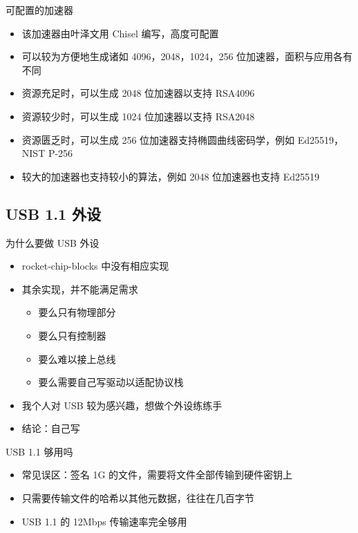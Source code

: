 \documentclass[aspectratio=169]{ctexbeamer}
\begin{document}
\begin{frame}{可配置的加速器}
  \begin{itemize}
    \item 该加速器由叶泽文用 Chisel 编写，高度可配置
    \item 可以较为方便地生成诸如 4096，2048，1024，256 位加速器，面积与应用各有不同
    \item 资源充足时，可以生成 2048 位加速器以支持 RSA4096
    \item 资源较少时，可以生成 1024 位加速器以支持 RSA2048
    \item 资源匮乏时，可以生成 256 位加速器支持椭圆曲线密码学，例如 Ed25519，NIST P-256
    \item 较大的加速器也支持较小的算法，例如 2048 位加速器也支持 Ed25519
  \end{itemize}
\end{frame}

\subsection{USB 1.1 外设} %
\begin{frame}{为什么要做 USB 外设}
  \begin{itemize}
    \item rocket-chip-blocks 中没有相应实现
    \item 其余实现，并不能满足需求\begin{itemize}
      \item 要么只有物理部分
      \item 要么只有控制器
      \item 要么难以接上总线
      \item 要么需要自己写驱动以适配协议栈
    \end{itemize}
    \item 我个人对 USB 较为感兴趣，想做个外设练练手
    \item 结论：自己写
  \end{itemize}
\end{frame}

\begin{frame}{USB 1.1 够用吗}
  \begin{itemize}
    \item 常见误区：签名 1G 的文件，需要将文件全部传输到硬件密钥上
    \item 只需要传输文件的哈希以其他元数据，往往在几百字节
    \item USB 1.1 的 12Mbps 传输速率完全够用
  \end{itemize}
\end{frame}
\end{document}
